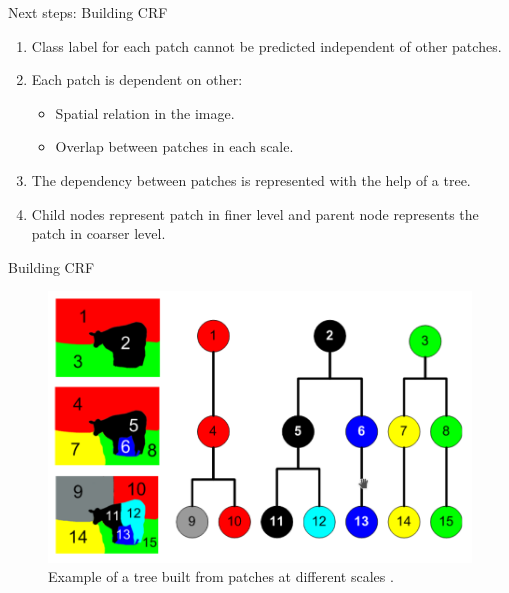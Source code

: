 \documentclass{beamer}
\begin{document}
\begin{frame}{Next steps: Building CRF}
  \begin{enumerate}
    \item Class label for each patch cannot be predicted independent of other patches.
    \item Each patch is dependent on other:
    \begin{itemize}
      \item Spatial relation in the image.
      \item Overlap between patches in each scale.        
    \end{itemize}    
    \item The dependency between patches is represented with the help of a tree.
    \item Child nodes represent patch in finer level and parent node represents the patch in coarser level.    
\end{enumerate}
\end{frame}

\begin{frame}{Building CRF}
  
 \begin{figure}[!hbp]
   \centering
   \includegraphics[width=0.9\linewidth]{images/patch_ex}
   \caption{Example of a tree built from patches at different scales \cite{Reynolds:2007}.}
   \label{fig_patch_ex}
  \end{figure}  
\end{frame}
\end{document}
